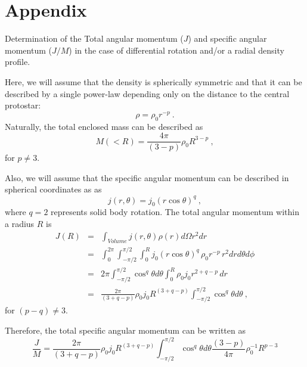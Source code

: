 \section{Appendix}
Determination of the Total angular momentum ($J$) and specific angular momentum ($J/M$) in the case of differential rotation and/or a radial density profile.

Here, we will assume that the density is spherically symmetric and that it can be described 
by a single power-law depending only on the distance to the central protostar:
\begin{equation}
\rho = \rho_0 r^{-p}~. \label{eq:density}
\end{equation}
Naturally, the total enclosed mass can be described as 
\begin{equation}
M(<R) = \frac{4\pi}{(3-p)} \rho_0 R^{3-p}~,
\end{equation}
for $p\ne 3$.

Also, we will assume that the specific angular momentum can be described in spherical coordinates as as
\begin{equation}
j(r,\theta) = j_0 ( r \cos \theta)^q~,
\end{equation}
where $q=2$ represents solid body rotation.
%
The total angular momentum within a radius $R$ is
\begin{eqnarray}
J(R) &=& \int_{Volume} j(r,\theta) \rho(r) d\Omega r^2 dr \\
&=& \int_0^{2\pi}\int_{-\pi/2}^{\pi/2}\int_0^R j_0 ( r \cos \theta)^q\, \rho_0 r^{-p}\, r^2 dr d\theta d\phi\\
&=& 2\pi \int_{-\pi/2}^{\pi/2} \cos^q \theta d\theta \int_0^R \rho_0 j_0 r^{2+q-p} \,dr \nonumber \\
&=& \frac{2\pi}{(3+q-p)}\rho_0 j_0 R^{(3+q-p)} \int_{-\pi/2}^{\pi/2} \cos^q \theta d\theta~,
\end{eqnarray}
for $(p-q)\ne 3$.

Therefore, the total specific angular momentum can be written as
\begin{equation}
\frac{J}{M} = \frac{2\pi}{(3+q-p)}\rho_0 j_0 R^{(3+q-p)} \int_{-\pi/2}^{\pi/2} \cos^q \theta d\theta 
\frac{(3-p)}{4\pi} \rho_0^{-1} R^{p-3}
\end{equation}